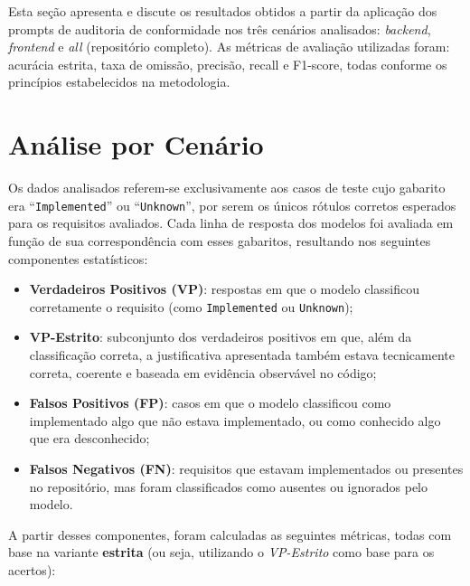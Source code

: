 \label{cap:resultados}

Esta seção apresenta e discute os resultados obtidos a partir da aplicação dos prompts de auditoria de conformidade nos três cenários analisados: \textit{backend}, \textit{frontend} e \textit{all} (repositório completo). As métricas de avaliação utilizadas foram: acurácia estrita, taxa de omissão, precisão, recall e F1-score, todas conforme os princípios estabelecidos na metodologia.

\section{Análise por Cenário}

Os dados analisados referem-se exclusivamente aos casos de teste cujo gabarito era “\texttt{Implemented}” ou “\texttt{Unknown}”, por serem os únicos rótulos corretos esperados para os requisitos avaliados. Cada linha de resposta dos modelos foi avaliada em função de sua correspondência com esses gabaritos, resultando nos seguintes componentes estatísticos:

\begin{itemize}
    \item \textbf{Verdadeiros Positivos (VP)}: respostas em que o modelo classificou corretamente o requisito (como \texttt{Implemented} ou \texttt{Unknown});
    \item \textbf{VP-Estrito}: subconjunto dos verdadeiros positivos em que, além da classificação correta, a justificativa apresentada também estava tecnicamente correta, coerente e baseada em evidência observável no código;
    \item \textbf{Falsos Positivos (FP)}: casos em que o modelo classificou como implementado algo que não estava implementado, ou como conhecido algo que era desconhecido;
    \item \textbf{Falsos Negativos (FN)}: requisitos que estavam implementados ou presentes no repositório, mas foram classificados como ausentes ou ignorados pelo modelo.
\end{itemize}

A partir desses componentes, foram calculadas as seguintes métricas, todas com base na variante \textbf{estrita} (ou seja, utilizando o \textit{VP-Estrito} como base para os acertos):

